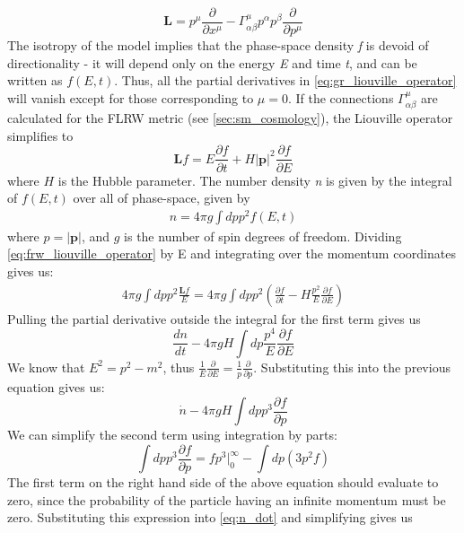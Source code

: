 \begin{equation}\label{eq:gr_liouville_operator}
  \mathbf{L} = p^\mu\frac{\partial}{\partial x^\mu} - \Gamma^\mu_{\alpha\beta}p^\alpha p^\beta\frac{\partial}{\partial p^\mu}
\end{equation}
The isotropy of the model implies that the phase-space density \emph{f} is devoid of directionality - it will depend only on the energy \emph{E} and time \emph{t}, and can be written as $f(E,t)$. Thus, all the partial derivatives in \autoref{eq:gr_liouville_operator} will vanish except for those corresponding to $\mu = 0$. If the connections $\Gamma^\mu_{\alpha\beta}$ are calculated for the FLRW metric (see \autoref{sec:sm_cosmology}), the Liouville operator simplifies to
\begin{equation}\label{eq:frw_liouville_operator}
  \mathbf{L}f = E\frac{\partial f}{\partial t} + H|\mathbf{p}|^2 \frac{\partial f}{\partial E}
\end{equation}
where $H$ is the Hubble parameter. The number density \emph{n} is given by the integral of $f(E,t)$ over all of phase-space, given by
\begin{align}
  n = 4\pi g\int dp p^2 f(E,t)
\end{align}
where $p = |\mathbf{p}|$, and $g$ is the number of spin degrees of freedom.
Dividing \autoref{eq:frw_liouville_operator} by E and integrating over the momentum coordinates gives us:
\begin{align}
  4\pi g\int dp p^2 \frac{\mathbf{L}f}{E} = 4\pi g\int dp p^2 \left(\frac{\partial f}{\partial t}- H\frac{p^2}{E}\frac{\partial f}{\partial E}\right)
\end{align}
Pulling the partial derivative outside the integral for the first term gives us
\begin{equation}
  \frac{dn}{dt} - 4\pi gH\int dp\frac{p^4}{E}\frac{\partial f}{\partial E}
\end{equation}
We know that $E^2 = p^2 - m^2$, thus $\frac{1}{E}\frac{\partial}{\partial E} = \frac{1}{p}\frac{\partial}{\partial p}$. Substituting this into the previous equation gives us:
\begin{equation}\label{eq:n_dot}
  \dot{n} - 4\pi gH\int dp p^3 \frac{\partial f}{\partial p}
\end{equation}
We can simplify the second term using integration by parts:
\begin{equation}
  \int dp p^3\frac{\partial f}{\partial p} = fp^3|_{0}^\infty - \int dp (3p^2 f)
\end{equation}
The first term on the right hand side of the above equation should evaluate to zero, since the probability of the particle having an infinite momentum must be zero. Substituting this expression into \autoref{eq:n_dot} and simplifying gives us
